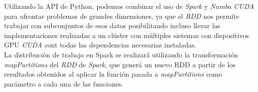 Utilizando la API de Python, podemos combinar el uso de \textit{Spark} y \textit{Numba CUDA} para afrontar problemas de grandes dimensiones, ya que el \textit{RDD} nos permite trabajar con subconjuntos de esos datos posibilitando incluso llevar las implementaciones realizadas a un clúster con múltiples sistemas con dispositivos GPU \textit{CUDA} cont todas las dependencias necesarias instaladas. \\

La distribución de trabajo en Spark se realizará utilizando la transformación \textit{mapPartitions} del \textit{RDD} de \textit{Spark}, que generá un nuevo RDD a partir de los resultados obtenidos al aplicar la función pasada a \textit{mapPartitions} como parámetro a cada una de las funciones.

